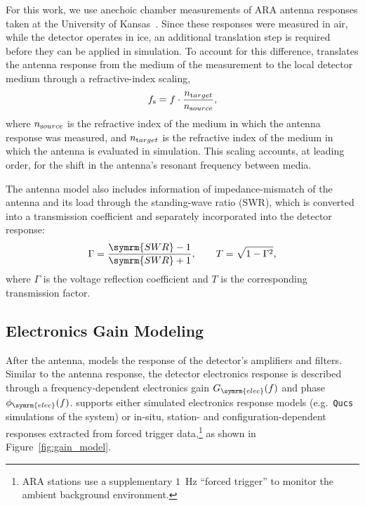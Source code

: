         For this work, we use anechoic chamber measurements of ARA antenna responses taken at the University of Kansas~\citep{KU-antennas}.
        Since these responses were measured in air, while the detector operates in ice, an additional translation step is required before they can be applied in simulation.
        To account for this difference, \arasim{} translates the antenna response from the medium of the measurement to the local detector medium through a refractive-index scaling,
        \begin{equation}
        f_{\textrm s} = f\cdot \frac{n_{\textrm target}}{n_{\textrm source}},
        \end{equation}
        where $n_{\textrm source}$ is the refractive index of the medium in which the antenna response was measured, and $n_{\textrm target}$ is the refractive index of the medium in which the antenna is evaluated in simulation.
        This scaling accounts, at leading order, for the shift in the antenna's resonant frequency between media.
        
        The antenna model also includes information of impedance-mismatch of the antenna and its load through the standing-wave ratio (SWR), which is converted into a transmission coefficient and separately incorporated into the detector response:
        \begin{equation}
        \Gamma = \frac{\symrm{SWR}-1}{\symrm{SWR}+1},
        \qquad
        T = \sqrt{1-\Gamma^2},
        \end{equation}
        where $\Gamma$ is the voltage reflection coefficient and $T$ is the corresponding transmission factor.
        
        \subsection{Electronics Gain Modeling}

        After the antenna, \arasim{} models the response
        of the detector's amplifiers and filters.
        Similar to the antenna response, the detector electronics response is described through a frequency-dependent electronics gain $G_{\symrm{elec}}(f)$
        and phase
        $\phi_{\symrm{elec}}(f)$.
        \arasim{} supports either simulated electronics response models (e.g.\ \texttt{Qucs} simulations of the system) or in-situ, station- and configuration-dependent responses extracted from forced trigger data,\footnote{ARA stations use a supplementary $1$~Hz ``forced trigger'' to monitor the ambient background environment.} as shown in Figure~\ref{fig:gain_model}.

